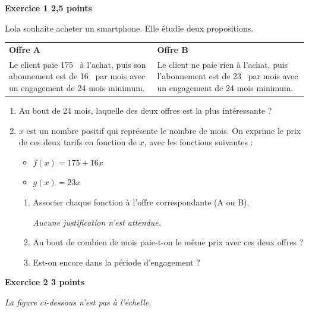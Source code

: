 \documentclass[11pt]{article}
\newcommand{\euro}{\eurologo{}}
\begin{document}
\medskip

\textbf{Exercice 1 \hfill 2,5 points}

Lola souhaite acheter un smartphone. Elle étudie deux propositions.

\begin{center}
\begin{tabular}{p{7cm} p{7cm}}
\textbf{Offre A} & \textbf{Offre B} \\
Le client paie 175~\euro{} à l'achat, puis son abonnement est de 16~\euro{} par mois avec un engagement de 24 mois minimum. &
Le client ne paie rien à l'achat, puis l'abonnement est de 23~\euro{} par mois avec un engagement de 24 mois minimum.
\end{tabular}
\end{center}

\begin{enumerate}
\item Au bout de 24 mois, laquelle des deux offres est la plus intéressante ?
\item $x$ est un nombre positif qui représente le nombre de mois. On exprime le prix de ces deux tarifs en fonction de $x$, avec les fonctions suivantes :

\begin{itemize}
\item $f(x) = 175 + 16x$
\item $g(x) = 23x$
\end{itemize}

	\begin{enumerate}[label={\textbf{\alph*.}}]
		\item Associer chaque fonction à l'offre correspondante (A ou B).

\emph{Aucune justification n'est attendue.}
		\item Au bout de combien de mois paie-t-on le même prix avec ces deux offres ?
		\item Est-on encore dans la période d'engagement ?
	\end{enumerate}
\end{enumerate}

\textbf{Exercice 2 \hfill 3 points}

\emph{La figure ci-dessous n'est pas à l'échelle.}
\end{document}
